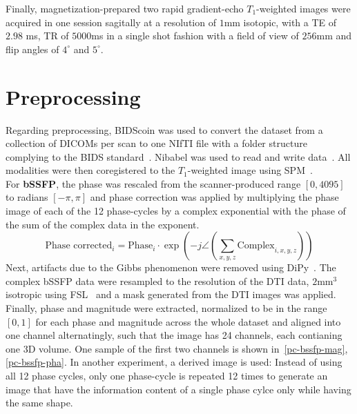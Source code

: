 Finally, magnetization-prepared two rapid gradient-echo $T_1$-weighted images were acquired in one session sagitally at a resolution of $1$mm isotopic, with a TE of $2.98$ ms, TR of $5000$ms in a single shot fashion with a field of view of $256$mm and flip angles of $4^\circ$ and $5^\circ$. \\

\section{Preprocessing}
Regarding preprocessing, BIDScoin was used to convert the dataset from a collection of DICOMs per scan to one NIfTI file with a folder structure complying to the BIDS standard~\autocite{zwiers_bidscoin_2022, yarkoni_pybids_2019, gorgolewski_brain_2016}.
Nibabel was used to read and write data~\autocite{brett_nipynibabel_2024}.
All modalities were then coregistered to the $T_1$-weighted image using SPM~\autocite{friston_statistical_1994}. \\

For \textbf{bSSFP}, the phase was rescaled from the scanner-produced range $[0, 4095]$ to radians $[-\pi,\pi]$ and phase correction was applied by multiplying the phase image of each of the 12 phase-cycles by a complex exponential with the phase of the sum of the complex data in the exponent.
\[ \text{Phase corrected}_i = \text{Phase}_i \cdot \exp\left( -j \angle \left(\sum_{x, y, z} \text{Complex}_{i, x, y, z}\right) \right) \]
Next, artifacts due to the Gibbs phenomenon were removed using DiPy~\autocite{garyfallidis_dipy_2014}.
The complex bSSFP data were resampled to the resolution of the DTI data, $2$mm$^3$ isotropic using FSL~\autocite{smith_advances_2004} and a mask generated from the DTI images was applied.
Finally, phase and magnitude were extracted, normalized to be in the range $[0, 1]$ for each phase and magnitude across the whole dataset and aligned into one channel alternatingly, such that the image has 24 channels, each contianing one 3D volume.
One sample of the first two channels is shown in~\ref{pc-bssfp-mag}, \ref{pc-bssfp-pha}.
In another experiment, a derived image is used: Instead of using all 12 phase cycles, only one phase-cycle is repeated 12 times to generate an image that have the information content of a single phase cylce only while having the same shape. \\



